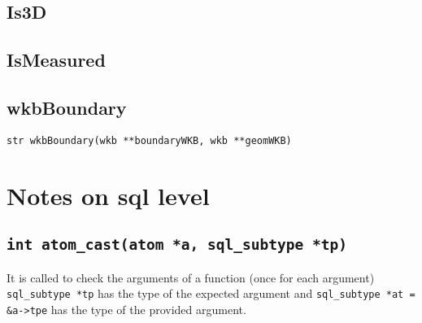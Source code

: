 \documentclass{article}
\begin{document}
\subsection{Is3D}

\subsection{IsMeasured}

\subsection{wkbBoundary}

{\tt str wkbBoundary(wkb **boundaryWKB, wkb **geomWKB)}

\section{Notes on sql level}

\subsection{{\tt int atom\_cast(atom *a, sql\_subtype *tp)}}
It is called to check the arguments of a function (once for each argument) \\
{\tt sql\_subtype *tp} has the type of the expected argument and {\tt sql\_subtype *at = \&a->tpe} 
has the type of the provided argument.
\end{document}
